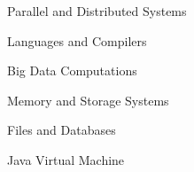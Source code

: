
\begin{minipage}[t]{.33\linewidth}
  \begin{cvitems}
    \item Parallel and Distributed Systems
    \item Languages and Compilers
  \end{cvitems}
\end{minipage}%
%
\hspace{40pt}
%
\begin{minipage}[t]{.33\linewidth}
  \begin{cvitems}
    \item Big Data Computations
    \item Memory and Storage Systems
  \end{cvitems}
\end{minipage}%
%
\hspace{35pt}
%
\begin{minipage}[t]{.33\linewidth}
  \begin{cvitems}
    \item Files and Databases
    \item Java Virtual Machine
  \end{cvitems}
\end{minipage}

\vspace{15pt}
